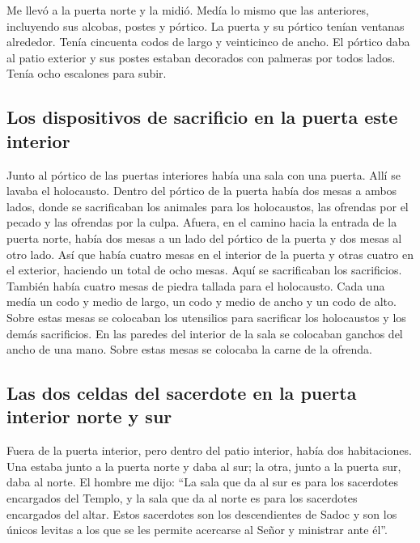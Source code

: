  Me llevó a la puerta norte y la midió. Medía lo mismo
que las anteriores,  incluyendo sus alcobas, postes y
pórtico. La puerta y su pórtico tenían ventanas alrededor. Tenía
cincuenta codos de largo y veinticinco de ancho.  El
pórtico daba al patio exterior y sus postes estaban decorados con
palmeras por todos lados. Tenía ocho escalones para subir.

\hypertarget{los-dispositivos-de-sacrificio-en-la-puerta-este-interior}{%
\subsection{Los dispositivos de sacrificio en la puerta este
interior}\label{los-dispositivos-de-sacrificio-en-la-puerta-este-interior}}

 Junto al pórtico de las puertas interiores había una
sala con una puerta. Allí se lavaba el holocausto. 
Dentro del pórtico de la puerta había dos mesas a ambos lados, donde se
sacrificaban los animales para los holocaustos, las ofrendas por el
pecado y las ofrendas por la culpa.  Afuera, en el camino
hacia la entrada de la puerta norte, había dos mesas a un lado del
pórtico de la puerta y dos mesas al otro lado.  Así que
había cuatro mesas en el interior de la puerta y otras cuatro en el
exterior, haciendo un total de ocho mesas. Aquí se sacrificaban los
sacrificios.  También había cuatro mesas de piedra
tallada para el holocausto. Cada una medía un codo y medio de largo, un
codo y medio de ancho y un codo de alto. Sobre estas mesas se colocaban
los utensilios para sacrificar los holocaustos y los demás sacrificios.
 En las paredes del interior de la sala se colocaban
ganchos del ancho de una mano. Sobre estas mesas se colocaba la carne de
la ofrenda.

\hypertarget{las-dos-celdas-del-sacerdote-en-la-puerta-interior-norte-y-sur}{%
\subsection{Las dos celdas del sacerdote en la puerta interior norte y
sur}\label{las-dos-celdas-del-sacerdote-en-la-puerta-interior-norte-y-sur}}

 Fuera de la puerta interior, pero dentro del patio
interior, había dos habitaciones. Una estaba junto a la puerta norte y
daba al sur; la otra, junto a la puerta sur, daba al norte.
 El hombre me dijo: ``La sala que da al sur es para los
sacerdotes encargados del Templo,  y la sala que da al
norte es para los sacerdotes encargados del altar. Estos sacerdotes son
los descendientes de Sadoc y son los únicos levitas a los que se les
permite acercarse al Señor y ministrar ante él''.


